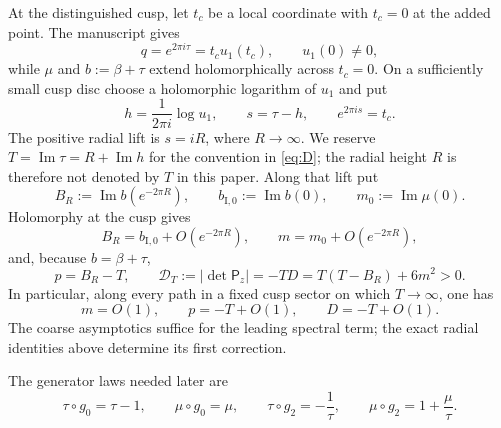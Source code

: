 \documentclass[11pt]{article}
\numberwithin{equation}{section}
\theoremstyle{definition}
\theoremstyle{remark}
\begin{document}
At the distinguished cusp, let $t_c$ be a local coordinate with $t_c=0$ at the added point.  The manuscript gives
\begin{equation}\label{eq:cusp-input}
 q=e^{2\pi i\tau}=t_cu_1(t_c),\qquad u_1(0)\ne0,
\end{equation}
while $\mu$ and $b:=\beta+\tau$ extend holomorphically across $t_c=0$.
On a sufficiently small cusp disc choose a holomorphic logarithm of $u_1$ and
put
\begin{equation}\label{eq:cusp-s-coordinate}
 h=\frac{1}{2\pi i}\log u_1,\qquad
 s=\tau-h,\qquad e^{2\pi i s}=t_c.
\end{equation}
The positive radial lift is $s=iR$, where $R\to\infty$.  We reserve
$T=\operatorname{Im}\tau=R+\operatorname{Im}h$ for the convention in
\eqref{eq:D}; the radial height $R$ is therefore not denoted by $T$ in this
paper.  Along that lift put
\begin{equation}\label{eq:radial-b-data}
 B_R:=\operatorname{Im}b(e^{-2\pi R}),\qquad
 b_{\mathrm I,0}:=\operatorname{Im}b(0),\qquad
 m_0:=\operatorname{Im}\mu(0).
\end{equation}
Holomorphy at the cusp gives
\begin{equation}\label{eq:radial-holomorphic-errors}
 B_R=b_{\mathrm I,0}+O(e^{-2\pi R}),\qquad
 m=m_0+O(e^{-2\pi R}),
\end{equation}
and, because $b=\beta+\tau$,
\begin{equation}\label{eq:radial-covolume-exact}
 p=B_R-T,\qquad
 \mathcal D_T:=|\det\mathsf P_z|=-TD
 =T(T-B_R)+6m^2>0.
\end{equation}
In particular, along every path in a fixed cusp sector on which $T\to\infty$,
one has
\begin{equation}\label{eq:cusp-asymptotic-input}
 m=O(1),\qquad p=-T+O(1),\qquad D=-T+O(1).
\end{equation}
The coarse asymptotics suffice for the leading spectral term; the exact
radial identities above determine its first correction.

The generator laws needed later are
\begin{equation}\label{eq:generator-laws}
 \tau\circ g_0=\tau-1,\qquad \mu\circ g_0=\mu,
 \qquad
 \tau\circ g_2=-\frac1\tau,\qquad
 \mu\circ g_2=1+\frac\mu\tau.
\end{equation}
\end{document}
